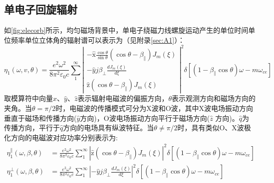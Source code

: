 \subsection{单电子回旋辐射}
如\autoref{fig:elecorb}所示，均匀磁场背景中，单电子绕磁力线螺旋运动产生的单位时间单位频率单位立体角的辐射谱可以表示为（见附录\autoref{sec:A1}）：
\begin{equation}\label{eq:nw}
\eta_{1}(\omega, v, \theta)=\frac{e^{2} \omega^{2}}{8 \pi^{2} \varepsilon_{0} c} \sum_{1}^{\infty}\left|\begin{array}{c}-\hat{\mathrm{x}} \frac{\cos \theta}{\sin \theta}\left(\cos \theta-\beta_{\|}\right) J_{m}(\xi) \\-\hat{y} j \beta_{\perp} \frac{d J_{m}(\xi)}{d \xi} \\\hat{\mathrm{z}}\left(\cos \theta-\beta_{\|}\right) J_{m}(\xi)\end{array}\right|^{2} \delta\left[\left(1-\beta_{\|} \cos \theta\right) \omega-m \omega_{c e}\right]
\end{equation}
取模算符中向量$\hat{x}$、$\hat{y}$、$\hat{z}$表示辐射电磁波的偏振方向，$θ$表示观测方向和磁场方向的夹角。当$θ=π/2$时，电磁波的传播模式可分为X波和O波，其中X波电场振动方向垂直于磁场和传播方向($\hat{y}$方向)，O波电场振动方向平行于磁场方向($\hat{z}$ 方向)。$\hat{q}$为传播方向，平行于$\hat{q}$方向的电场具有纵波特征。当$θ≠π/2$时，具有类似O、X波极化方向的电磁波对应功率分别表示为:
\begin{subequations}\label{eq:etapp}
\begin{align}
\eta_{1}^{\|}(\omega, \beta, \theta)&=\frac{e^{2} \omega^{2}}{8 \pi^{2} \varepsilon_{0} c}\sum_{1}^{\infty}\left|\hat{\mathrm{z}}\left(\cos \theta-\beta_{\|}\right) J_{m}(\xi)\right|^{2} \delta\left[\left(1-\beta_{\|} \cos \theta\right) \omega-m \omega_{c e}\right]\\
\eta_{1}^{\perp}(\omega, \beta, \theta)&=\frac{e^{2} \omega^{2}}{8 \pi^{2} \varepsilon_{0} c}\sum_{1}^{\infty}\left|-\hat{y} j \beta_{\perp} \frac{d J_{m}(\xi)}{d \xi}\right|^{2} \delta\left[\left(1-\beta_{\|} \cos \theta\right) \omega-m \omega_{c e}\right]
\end{align}
\end{subequations}

